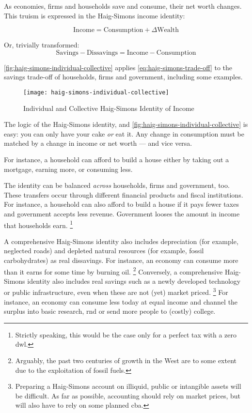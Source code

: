 As economies, firms and households save and consume, their net worth changes.
This truism is expressed in the Haig-Simons income identity:

\begin{equation}
	\label{eq:haig-simons}
	\text{Income}=\text{Consumption}+\Delta\text{Wealth}
\end{equation}

Or, trivially transformed:
\begin{equation}
	\label{eq:haig-simons-trade-off}
	\text{Savings}-\text{Dissavings}=\text{Income}-\text{Consumption}
\end{equation}

\autoref{fig:haig-simons-individual-collective} applies \autoref{eq:haig-simons-trade-off} to the savings trade-off of households, firms and government, including some examples.

\begin{figure}[htbp]
	\centering
	\texttt{[image: haig-simons-individual-collective]}
	\caption{Individual and Collective Haig-Simons Identity of Income}
	\label{fig:haig-simons-individual-collective} %
\end{figure}

The logic of the Haig-Simons identity, and \autoref{fig:haig-simons-individual-collective} is easy:
you can only have your cake \emph{or} eat it.
Any change in consumption must be matched by a change in income or net worth --- and vice versa.

For instance, a household can afford to build a house either by taking out a mortgage, earning more, or consuming less.

The identity can be balanced \emph{across} households, firms and government, too.
These transfers occur through different financial products and fiscal institutions.
For instance, a household can also afford to build a house if it pays fewer taxes and government accepts less revenue.
Government looses the amount in income that households earn.
\footnote{
	Strictly speaking, this would be the case only for a perfect tax with a zero \gls{dwl}.
}

A comprehensive Haig-Simons identity also includes depreciation (for example, neglected roads) and depleted natural resources (for example, fossil carbohydrates) as real dissavings.
For instance, an economy can consume more than it earns for some time by burning oil.
\footnote{
	Arguably, the past two centuries of growth in the West are to some extent due to the exploitation of fossil fuels.
}
Conversely, a comprehensive Haig-Simons identity also includes real savings such as a newly developed technology or public infrastructure, even when these are not (yet) market priced.
\footnote{
	Preparing a Haig-Simons account on illiquid, public or intangible assets will be difficult.
	As far as possible, accounting should rely on market prices, but will also have to rely on  some planned \gls{cba}.
}
For instance, an economy can consume less today at equal income and channel the surplus into basic research, \gls{rnd} or send more people to (costly) college.

